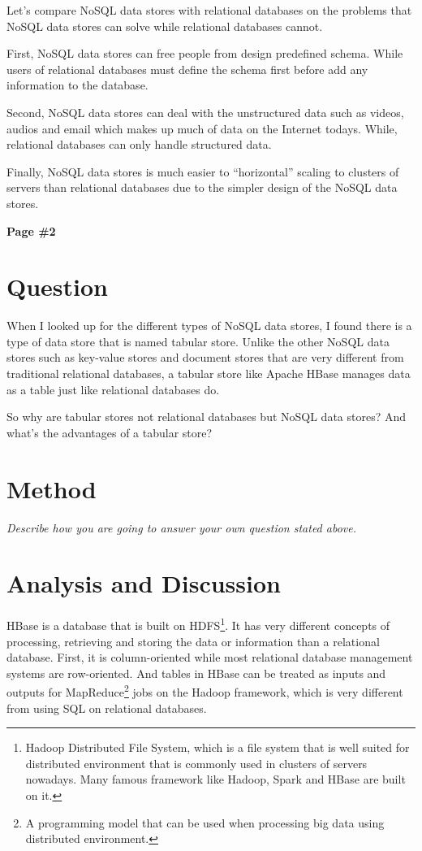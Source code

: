 \documentclass[12pt, a4paper]{article}
\begin{document}
Let's compare NoSQL data stores with relational databases on the problems that NoSQL data stores can solve while relational databases cannot.

First, NoSQL data stores can free people from design predefined schema. While users of relational databases must define the schema first before add any information to the database.\cite{diff}

Second, NoSQL data stores can deal with the unstructured data such as videos, audios and email which makes up much of data on the Internet todays. While, relational databases can only handle structured data.\cite{diff}

Finally, NoSQL data stores is much easier to ``horizontal'' scaling to clusters of servers than relational databases due to the simpler design of the NoSQL data stores.\cite{wiki}


\newpage

\begin{center}
{\textbf{
Page \#2}}
\end{center}

\section{Question}

When I looked up for the different types of NoSQL data stores, I found there is a type of data store that is named tabular store. Unlike the other NoSQL data stores such as key-value stores and document stores that are very different from traditional relational databases, a tabular store like Apache HBase manages data as a table just like relational databases do.

So why are tabular stores not relational databases but NoSQL data stores? And what's the advantages of a tabular store?

\section{Method}

{\emph{Describe how you are going to answer your own question stated above.}}

\section{Analysis and Discussion}

HBase is a database that is built on HDFS\footnote{Hadoop Distributed File System, which is a file system that is well suited for distributed environment that is commonly used in clusters of servers nowadays. Many famous framework like Hadoop, Spark and HBase are built on it.}. It has very different concepts of processing, retrieving and storing the data or information than a relational database. First, it is column-oriented while most relational database management systems are row-oriented. And tables in HBase can be treated as inputs and outputs for MapReduce\footnote{A programming model that can be used when processing big data using distributed environment.} jobs on the Hadoop framework, which is very different from using SQL on relational databases.
\end{document}
